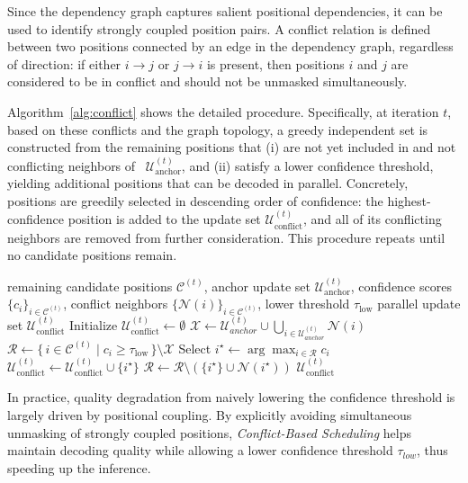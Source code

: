 Since the dependency graph captures salient positional dependencies, it can be used to identify strongly coupled position pairs. A conflict relation is defined between two positions connected by an edge in the dependency graph, regardless of direction: if either $i\rightarrow j$ or $j\rightarrow i$ is present, then positions $i$ and $j$ are considered to be in conflict and should not be unmasked simultaneously.

Algorithm~\ref{alg:conflict} shows the detailed procedure. Specifically, at iteration $t$, based on these conflicts and the graph topology, a greedy independent set is constructed from the remaining positions that (i) are not yet included in and not conflicting neighbors of ~$\mathcal{U}^{(t)}_{\text{anchor}}$, and (ii) satisfy a lower confidence threshold, yielding additional positions that can be decoded in parallel. Concretely, positions are greedily selected in descending order of confidence: the highest-confidence position is added to the update set $\mathcal{U}^{(t)}_{\text{conflict}}$, and all of its conflicting neighbors are removed from further consideration. This procedure repeats until no candidate positions remain.

\begin{algorithm}[tb]
  \caption{Conflict-Based Scheduling}
  \label{alg:conflict}
  \begin{algorithmic}[1]
     remaining candidate positions $\mathcal{C}^{(t)}$, anchor update set $\mathcal{U}^{(t)}_{\text{anchor}}$, confidence scores $\{c_i\}_{i\in\mathcal{C}^{(t)}}$, conflict neighbors $\{\mathcal{N}(i)\}_{i\in\mathcal{C}^{(t)}}$, lower threshold $\tau_{\mathrm{low}}$
     parallel update set $\mathcal{U}^{(t)}_{\text{conflict}}$
    \STATE Initialize $\mathcal{U}^{(t)}_{\text{conflict}} \leftarrow \emptyset$
    \STATE $\mathcal{X} \leftarrow \mathcal{U}^{(t)}_{anchor} \cup \bigcup_{i \in \mathcal{U}^{(t)}_{anchor}} \mathcal{N}(i)$ 
    \STATE $\mathcal{R} \leftarrow \{\, i \in \mathcal{C}^{(t)} \mid c_i \ge \tau_{\mathrm{low}} \,\} \setminus \mathcal{X}$ 
      \STATE Select $i^\star \leftarrow \arg\max_{i \in \mathcal{R}} c_i$
      \STATE $\mathcal{U}^{(t)}_{\text{conflict}} \leftarrow \mathcal{U}^{(t)}_{\text{conflict}} \cup \{i^\star\}$
      \STATE $\mathcal{R} \leftarrow \mathcal{R} \setminus \left(\{i^\star\} \cup \mathcal{N}(i^\star)\right)$
    \ENDWHILE
     $\mathcal{U}^{(t)}_{\text{conflict}}$
  \end{algorithmic}
\end{algorithm}

In practice, quality degradation from naively lowering the confidence threshold is largely driven by positional coupling. By explicitly avoiding simultaneous unmasking of strongly coupled positions, \textit{Conflict-Based Scheduling} helps maintain decoding quality while allowing a lower confidence threshold $\tau_{low}$, thus speeding up the inference. 


